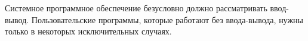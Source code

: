 Системное программное обеспечение безусловно должно рассматривать ввод-вывод. Пользовательские программы, которые работают без ввода-вывода, нужны только в некоторых исключительных случаях.